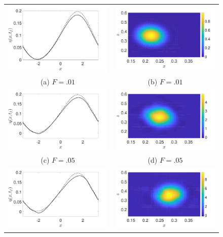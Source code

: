 \documentclass[a4paper,11pt]{article}
\begin{document}
\begin{figure}
\centering
\begin{tabular}{cc}
\includegraphics[width=.35\textwidth]{profiles_wm_1_modu_pt3} & \includegraphics[width=.35\textwidth]{vorticity_wm_1_modu_pt3}\\
(a)  $F=.01$ & (b)  $F=.01$\\
\includegraphics[width=.35\textwidth]{profiles_wm_5_modu_pt3} & \includegraphics[width=.35\textwidth]{vorticity_wm_5_modu_pt3}\\
(c)  $F=.05$ & (d)  $F=.05$\\
\includegraphics[width=.35\textwidth]{profiles_wm_10_modu_pt3} & \includegraphics[width=.35\textwidth]{vorticity_wm_10_modu_pt3}\\

\end{tabular}
\end{figure}
\end{document}
